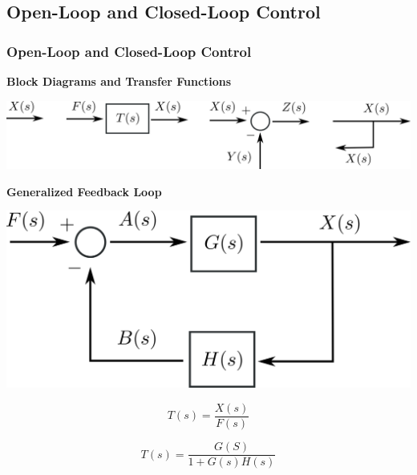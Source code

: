 \documentclass[fleqn]{beamer} %
\newcommand{\sectionIsubsectionItitle}{Open-Loop and Closed-Loop Control}
\begin{document}
		\subsection{\sectionIsubsectionItitle}\label{sectionIsubsectionI}

			\begin{frame}
				\frametitle{\sectionIsubsectionItitle}
				\bigskip

				\textbf{Block Diagrams and Transfer Functions} 

				\vspace*{5mm}
				\includegraphics[scale=0.04]{images/four_basic_symbols.png}

				\begin{multicols}{2}
				\textbf{Generalized Feedback Loop}

				\vspace*{5mm}
				\includegraphics[scale=0.03]{images/generalized_feedback_loop.png}

				\[ T(s)=\frac{X(s)}{F(s)}\]

				\[ T(s)=\frac{G(S)}{1+G(s)H(s)}\]
				\end{multicols}

				\btVFill
			\end{frame}
\end{document}
